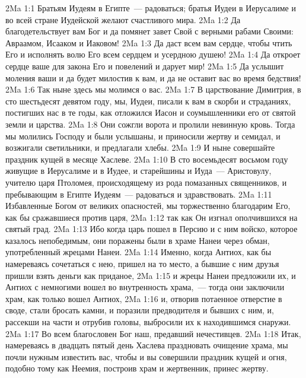 \vs 2Ma 1:1 Братьям Иудеям в Египте~--- радоваться; братья Иудеи в Иерусалиме и во всей стране Иудейской желают счастливого мира.
\vs 2Ma 1:2 Да благодетельствует вам Бог и да помянет завет Свой с верными рабами Своими: Авраамом, Исааком и Иаковом!
\vs 2Ma 1:3 Да даст всем вам сердце, чтобы чтить Его и исполнять волю Его всем сердцем и усердною душею!
\vs 2Ma 1:4 Да откроет сердце ваше для закона Его и повелений и дарует мир!
\vs 2Ma 1:5 Да услышит моления ваши и да будет милостив к вам, и да не оставит вас во время бедствия!
\vs 2Ma 1:6 Так ныне здесь мы молимся о вас.
\rsbpar\vs 2Ma 1:7 В царствование Димитрия, в сто шестьдесят девятом году, мы, Иудеи, писали к вам в скорби и страданиях, постигших нас в те годы, как отложился Иасон и соумышленники его от святой земли и царства.
\vs 2Ma 1:8 Они сожгли ворота и пролили невинную кровь. Тогда мы молились Господу и были услышаны, и приносили жертву и семидал, и возжигали светильники, и предлагали хлебы.
\vs 2Ma 1:9 И ныне совершайте праздник кущей в месяце Хаслеве.
\rsbpar\vs 2Ma 1:10 В сто восемьдесят восьмом году живущие в Иерусалиме и в Иудее, и старейшины и Иуда~--- Аристовулу, учителю царя Птоломея, происходящему из рода помазанных священников, и пребывающим в Египте Иудеям~--- радоваться и здравствовать.
\vs 2Ma 1:11 Избавленные Богом от великих опасностей, мы торжественно благодарим Его, как бы сражавшиеся против царя,
\vs 2Ma 1:12 так как Он изгнал ополчившихся на святый град.
\vs 2Ma 1:13 Ибо когда царь пошел в Персию и с ним войско, которое казалось непобедимым, они поражены были в храме Нанеи через обман, употребленный жрецами Нанеи.
\vs 2Ma 1:14 Именно, когда Антиох, как бы намереваясь сочетаться с нею, пришел на то место, а бывшие с ним друзья пришли взять деньги как приданое,
\vs 2Ma 1:15 и жрецы Нанеи предложили их, и Антиох с немногими вошел во внутренность храма,~--- тогда они заключили храм, как только вошел Антиох,
\vs 2Ma 1:16 и, отворив потаенное отверстие в своде, стали бросать камни, и поразили предводителя и бывших с ним, и, рассекши на части и отрубив головы, выбросили их к находившимся снаружи.
\vs 2Ma 1:17 Во всем благословен Бог наш, предавший нечестивцев.
\vs 2Ma 1:18 Итак, намереваясь в двадцать пятый день Хаслева праздновать очищение храма, мы почли нужным известить вас, чтобы и вы совершили праздник кущей и огня, подобно тому как Неемия, построив храм и жертвенник, принес жертву.
